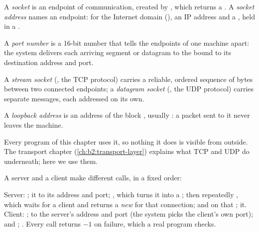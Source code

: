 \begin{definition}\label{def:b2:sockets:socket}
A \emph{socket} is an endpoint of communication, created by , which returns
a . A \emph{socket address} names an endpoint: for the Internet domain
(), an IP address and a , held in a .
\end{definition}

\begin{definition}\label{def:b2:sockets:port}
A \emph{port number} is a 16-bit number that tells the endpoints of one machine apart: the system
delivers each arriving segment or datagram to the  bound to its destination address and port.
\end{definition}

\begin{definition}\label{def:b2:sockets:kinds}
A \emph{stream socket} (, the TCP protocol) carries a reliable, ordered sequence
of bytes between two connected endpoints; a \emph{datagram socket} (, the UDP
protocol) carries separate messages, each addressed on its own.
\end{definition}

\begin{definition}\label{def:b2:sockets:loopback}
A \emph{loopback address} is an address of the block , usually
: a packet sent to it never leaves the machine.
\end{definition}

Every program of this chapter uses it, so nothing it does is visible from outside. The
transport chapter (\cref{ch:b2:transport-layer}) explains what TCP and UDP do underneath; here we use them.

A server and a client make different calls, in a fixed order:

\begin{method}\label{met:b2:sockets:server-skeleton}
Server: ;  it to its address and port; , which turns it into a ; then repeatedly , which waits for a client and returns a \emph{new}  for that connection;
 and  on that ;  it. Client: ;  to the server's
address and port (the system picks the client's own port);  and ; . Every call
returns $-1$ on failure, which a real program checks.
\end{method}

